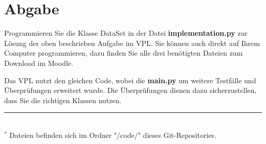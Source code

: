 \documentclass[12pt]{article}
\begin{document}
\section{Abgabe }
Programmieren Sie die Klasse DataSet in der Datei \textbf{implementation.py} zur Lösung der oben beschrieben Aufgabe im VPL.
Sie können auch direkt auf Ihrem Computer programmieren, dazu finden Sie alle drei benötigten Dateien zum Download im Moodle.

Das VPL nutzt den gleichen Code, wobei die \textbf{main.py} um weitere Testfälle und Überprüfungen erweitert wurde.
Die Überprüfungen dienen dazu sicherzustellen, dass Sie die richtigen Klassen nutzen. \\
\hrule\hfill\\[0.2cm]
$^*$ Dateien befinden sich im Ordner "/code/" dieses Git-Repositories.
\end{document}
